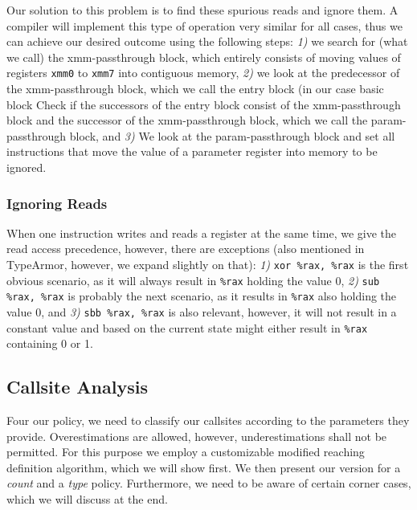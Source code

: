 Our solution to this problem is to find these spurious reads and ignore them. A compiler will implement this type of operation very 
similar for all cases, thus we can achieve our desired outcome using the following steps:
\textit{1)} we search for (what we call) the xmm-passthrough block, which entirely consists of moving values of registers \texttt{xmm0} to \texttt{xmm7} into
contiguous memory, %
\textit{2)} we look at the predecessor of the xmm-passthrough block, which we call the entry block (in our case basic block %
Check if the successors of the entry block consist of the xmm-passthrough block and the successor of the 
xmm-passthrough block, which we call the param-passthrough block, and
\textit{3)} We look at the param-passthrough block and set all instructions that move the value of a parameter register into memory to be ignored. 

\subsubsection{Ignoring Reads} When one instruction writes and reads a register at the same time, we give the read access precedence, however, there 
are exceptions (also mentioned in TypeArmor, however, we expand slightly on that):
\textit{1)} \texttt{xor \%rax, \%rax} is the first obvious scenario, as it will always result in \texttt{\%rax} holding the value 0,
\textit{2)} \texttt{sub \%rax, \%rax} is probably the next scenario, as it results in \texttt{\%rax} also holding the value 0, and
\textit{3)} \texttt{sbb \%rax, \%rax} is also relevant, however, it will not result in a constant value and based on the current state might either result 
in \texttt{\%rax} containing 0 or 1.

\subsection{Callsite Analysis}
\label{section:callsiteanalysis}
Four our policy, we need to classify our callsites according to the parameters they provide. Overestimations are allowed, however,
underestimations shall not be permitted. For this purpose we employ a customizable modified reaching definition algorithm, 
which we will show first. We then present our version for a \emph{count} and a \emph{type} policy. Furthermore, we need to 
be aware of certain corner cases, which we will discuss at the end.


